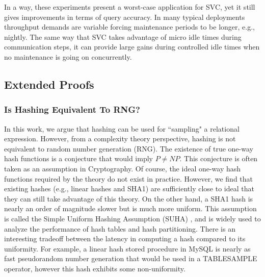 In a way, these experiments present a worst-case application for SVC, yet it still gives improvements in terms of query accuracy.
In many typical deployments throughput demands are variable forcing maintenance periods to be longer, e.g., nightly.
The same way that SVC takes advantage of micro idle times during communication steps, it can provide large gains during controlled idle times when no maintenance is going on concurrently.

\subsection{Extended Proofs}

\subsubsection{Is Hashing Equivalent To RNG?}
In this work, we argue that hashing can be used for ``sampling" a relational expression.
However, from a complexity theory perspective, hashing is not equivalent to random number generation (RNG).
The existence of true one-way hash functions is a conjecture that would imply $P \ne NP$.
This conjecture is often taken as an assumption in Cryptography.
Of course, the ideal one-way hash functions required by the theory do not exist in practice. However, we find that existing hashes (e.g., linear hashes and SHA1) are sufficiently close to ideal that they can still take advantage of this theory. 
On the other hand, a SHA1 hash is nearly an order of magnitude slower but is much more uniform.
This assumption is called the Simple Uniform Hashing Assumption (SUHA) \cite{cormenintroduction}, and is widely used to analyze the performance of hash tables and hash partitioning.
There is an interesting tradeoff between the latency in computing a hash compared to its uniformity. For example, a linear hash stored procedure in MySQL is nearly as fast pseudorandom number generation that would be used in a TABLESAMPLE operator, however this hash exhibits some non-uniformity. 

